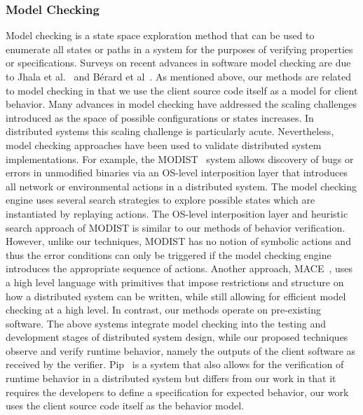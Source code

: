 \subsubsection{Model Checking}
Model checking is a state space exploration method that can be used to
enumerate all states or paths in a system for the purposes of
verifying properties or specifications. Surveys on recent advances in
software model checking are due to Jhala et
al.~\cite{jhala09:modelchecking} and B{\'e}rard et
al~\cite{berard13:modelchecking}. As mentioned above,
our methods are related to model
checking in that we use the client source code itself as a model for
client behavior. 
Many advances in model checking have
addressed the scaling challenges introduced as the space of possible
configurations or states increases. In distributed systems this
scaling challenge is particularly acute. Nevertheless, model checking
approaches have been used to validate distributed system implementations.
For example, the MODIST~\cite{yang09:modist} system allows discovery of bugs or 
errors in unmodified binaries via an OS-level interposition layer
that introduces all network or environmental actions in a distributed
system. The model checking engine uses several search strategies to
explore possible states which are instantiated by replaying actions.
The OS-level interposition layer and heuristic search approach of
MODIST is similar to our methods of behavior verification.
However, unlike our techniques, MODIST has no notion of symbolic actions and
thus the error conditions can only be triggered if the model checking
engine introduces the appropriate sequence of actions. Another 
approach, MACE~\cite{killian07:mace}, uses a high level language
with primitives that impose restrictions and structure on how a
distributed system can be written, while still allowing for efficient model
checking at a high level. In contrast, our methods operate on
pre-existing software. The above systems integrate model checking into
the testing and development stages of distributed system design,
while our proposed techniques observe and verify runtime behavior, namely
the outputs of the client software as received by the verifier.
Pip~\cite{reynolds06:pip} is a system that also allows for
the verification of runtime behavior in a distributed system but
differs from our work in that it requires the developers to define a
specification for expected behavior, our work uses the client source
code itself as the behavior model.

